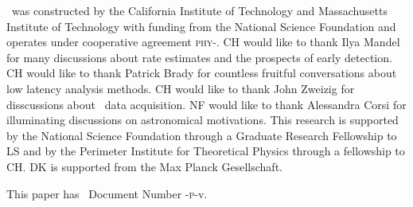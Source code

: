 \documentclass[preprint2]{aastex}
\begin{document}
\acknowledgements

\LIGO\ was constructed by the California Institute of Technology and
Massachusetts Institute of Technology with funding from the National Science
Foundation and operates under cooperative agreement
\textsc{phy}-.  CH would like to thank Ilya Mandel for
many discussions about rate estimates and the prospects of early detection.  CH
would like to thank Patrick Brady for countless fruitful conversations about
low latency analysis methods.  CH would like to thank John Zweizig for
disscussions about \LIGO\ data acquisition.  NF would like to thank Alessandra
Corsi for illuminating discussions on astronomical motivations.  This research
is supported by the National Science Foundation through a Graduate Research
Fellowship to LS and by the Perimeter Institute for Theoretical Physics through
a fellowship to CH. DK is supported from the Max Planck Gesellschaft. 

This paper has \LIGO\ Document Number \LIGO-\textsc{p}-v.



\end{document}
